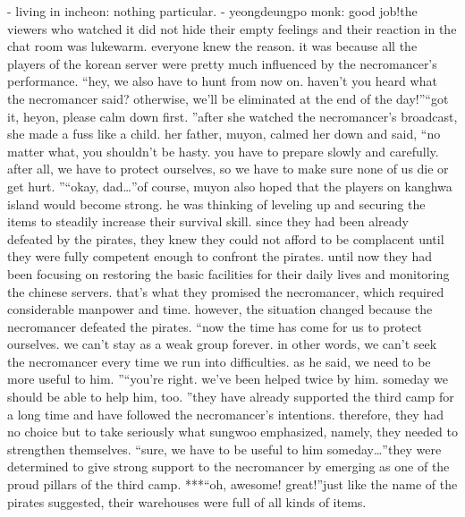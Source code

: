 - living in incheon: nothing particular.
- yeongdeungpo monk: good job!the viewers who watched it did not hide their empty feelings and their reaction in the chat room was lukewarm.
everyone knew the reason.
 it was because all the players of the korean server were pretty much influenced by the necromancer’s performance.
“hey, we also have to hunt from now on.
 haven’t you heard what the necromancer said? otherwise, we’ll be eliminated at the end of the day!”“got it, heyon, please calm down first.
”after she watched the necromancer’s broadcast, she made a fuss like a child.
her father, muyon, calmed her down and said, “no matter what, you shouldn’t be hasty.
 you have to prepare slowly and carefully.
 after all, we have to protect ourselves, so we have to make sure none of us die or get hurt.
”“okay, dad…”of course, muyon also hoped that the players on kanghwa island would become strong.
 he was thinking of leveling up and securing the items to steadily increase their survival skill.
since they had been already defeated by the pirates, they knew they could not afford to be complacent until they were fully competent enough to confront the pirates.
until now they had been focusing on restoring the basic facilities for their daily lives and monitoring the chinese servers.
 that’s what they promised the necromancer, which required considerable manpower and time.
however, the situation changed because the necromancer defeated the pirates.
“now the time has come for us to protect ourselves.
 we can’t stay as a weak group forever.
 in other words, we can’t seek the necromancer every time we run into difficulties.
 as he said, we need to be more useful to him.
”“you’re right.
 we’ve been helped twice by him.
 someday we should be able to help him, too.
”they have already supported the third camp for a long time and have followed the necromancer’s intentions.
 therefore, they had no choice but to take seriously what sungwoo emphasized, namely, they needed to strengthen themselves.
“sure, we have to be useful to him someday…”they were determined to give strong support to the necromancer by emerging as one of the proud pillars of the third camp.
***“oh, awesome! great!”just like the name of the pirates suggested, their warehouses were full of all kinds of items.

